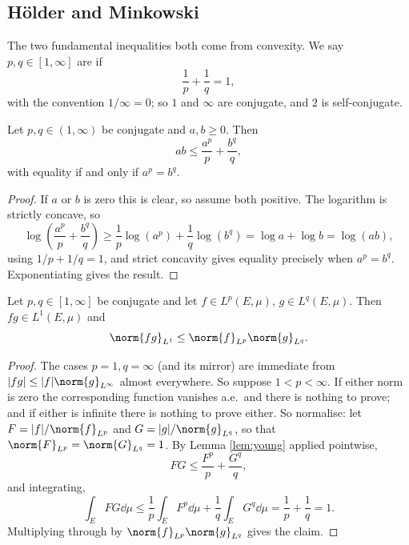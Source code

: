 \subsection{H\"older and Minkowski}

The two fundamental inequalities both come from convexity. We say $p, q \in [1,\infty]$ are  if
$$\frac{1}{p} + \frac{1}{q} = 1,$$
with the convention $1/\infty = 0$; so $1$ and $\infty$ are conjugate, and $2$ is self-conjugate.

\begin{lemma}\label{lem:young}
	Let $p, q \in (1,\infty)$ be conjugate and $a, b \ge 0$. Then
	$$ab \le \frac{a^p}{p} + \frac{b^q}{q},$$
	with equality if and only if $a^p = b^q$.
\end{lemma}

\begin{proof}
	If $a$ or $b$ is zero this is clear, so assume both positive. The logarithm is strictly concave, so
	$$\log\left( \frac{a^p}{p} + \frac{b^q}{q} \right) \ge \frac{1}{p} \log(a^p) + \frac{1}{q} \log (b^q) = \log a + \log b = \log(ab),$$
	using $1/p + 1/q = 1$, and strict concavity gives equality precisely when $a^p = b^q$. Exponentiating gives the result.
\end{proof}

\begin{theorem}\label{aof-thm:holder}
	Let $p, q \in [1,\infty]$ be conjugate and let $f \in L^p(E,\mu)$, $g \in L^q(E,\mu)$. Then $fg \in L^1(E,\mu)$ and
	$$\norm{fg}_{L^1} \le \norm{f}_{L^p} \norm{g}_{L^q}.$$
\end{theorem}

\begin{proof}
	The cases $p = 1, q= \infty$ (and its mirror) are immediate from $|fg| \le |f| \norm{g}_{L^\infty}$ almost everywhere. So suppose $1 < p < \infty$. If either norm is zero the corresponding function vanishes a.e.\ and there is nothing to prove; and if either is infinite there is nothing to prove either. So normalise: let $F = |f| / \norm{f}_{L^p}$ and $G = |g|/\norm{g}_{L^q}$, so that $\norm{F}_{L^p} = \norm{G}_{L^q} = 1$. By Lemma \ref{lem:young} applied pointwise,
	$$FG \le \frac{F^p}{p} + \frac{G^q}{q},$$
	and integrating,
	$$\int_E FG \dd\mu \le \frac{1}{p}\int_E F^p \dd \mu + \frac 1q \int_E G^q \dd\mu = \frac 1p + \frac 1q = 1.$$
	Multiplying through by $\norm{f}_{L^p}\norm{g}_{L^q}$ gives the claim.
\end{proof}

